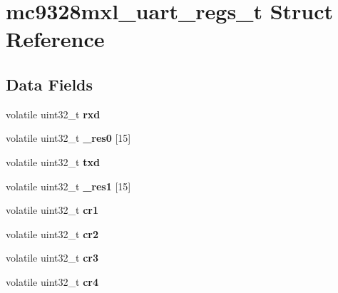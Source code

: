 \hypertarget{structmc9328mxl__uart__regs__t}{}\section{mc9328mxl\+\_\+uart\+\_\+regs\+\_\+t Struct Reference}
\label{structmc9328mxl__uart__regs__t}
\subsection*{Data Fields}
\begin{DoxyCompactItemize}
\item 
\mbox{\label{structmc9328mxl__uart__regs__t_a44be5fea329fcf22929eac16afefc57d}} 
volatile uint32\+\_\+t {\bfseries rxd}
\item 
\mbox{\label{structmc9328mxl__uart__regs__t_ad0922a1b0661dbf18c6ff2b084df604e}} 
volatile uint32\+\_\+t {\bfseries \+\_\+res0} \mbox{[}15\mbox{]}
\item 
\mbox{\label{structmc9328mxl__uart__regs__t_a68a066a1546f351c30289dd8f9dd5823}} 
volatile uint32\+\_\+t {\bfseries txd}
\item 
\mbox{\label{structmc9328mxl__uart__regs__t_ad08f0d66736c07201d37d6998bedb5c0}} 
volatile uint32\+\_\+t {\bfseries \+\_\+res1} \mbox{[}15\mbox{]}
\item 
\mbox{\label{structmc9328mxl__uart__regs__t_ad334cc6d03e0fc8ea847c9169bbf6ef4}} 
volatile uint32\+\_\+t {\bfseries cr1}
\item 
\mbox{\label{structmc9328mxl__uart__regs__t_a990115b2794e15c53292de7987b5e9fa}} 
volatile uint32\+\_\+t {\bfseries cr2}
\item 
\mbox{\label{structmc9328mxl__uart__regs__t_a8541581d323de2222e490321cd962386}} 
volatile uint32\+\_\+t {\bfseries cr3}
\item 
\mbox{\label{structmc9328mxl__uart__regs__t_aca0c0bbbaebac7d68e7af75fccd010e8}} 
volatile uint32\+\_\+t {\bfseries cr4}

\end{DoxyCompactItemize}
